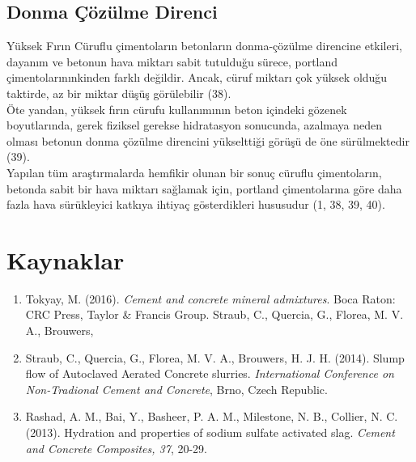 \documentclass[12pt]{article}
\begin{document}
\subsection{Donma Çözülme Direnci}
Yüksek Fırın Cüruflu çimentoların betonların donma-çözülme direncine
etkileri, dayanım ve betonun hava miktarı sabit tutulduğu sürece, portland
çimentolarınınkinden farklı değildir. Ancak, cüruf miktarı çok yüksek olduğu
taktirde, az bir miktar düşüş görülebilir (38).\\[9pt]
Öte yandan, yüksek fırın cürufu kullanımının beton içindeki gözenek
boyutlarında, gerek fiziksel gerekse hidratasyon sonucunda, azalmaya
neden olması betonun donma çözülme direncini yükselttiği görüşü de öne
sürülmektedir (39).\\[9pt]
Yapılan tüm araştırmalarda hemfikir olunan bir sonuç cüruflu çimentoların,
betonda sabit bir hava miktarı sağlamak için, portland çimentolarına göre
daha fazla hava sürükleyici katkıya ihtiyaç gösterdikleri hususudur (1, 38,
39, 40).
\newpage %
\section*{Kaynaklar}
\begin{enumerate}
\item Tokyay, M. (2016). \textit{Cement and concrete mineral admixtures}. Boca Raton: CRC Press, Taylor \& Francis Group.
Straub, C., Quercia, G., Florea, M. V. A., Brouwers, \item Straub, C., Quercia, G., Florea, M. V. A., Brouwers, H. J. H. (2014). Slump flow of Autoclaved Aerated Concrete slurries. \textit{International Conference on Non-Tradional Cement and Concrete}, Brno, Czech Republic.
\item Rashad, A. M., Bai, Y., Basheer, P. A. M., Milestone, N. B., Collier, N. C. (2013). Hydration and properties of sodium sulfate activated slag. \textit{Cement and Concrete Composites, 37}, 20-29.
\end{enumerate}
\end{document}
